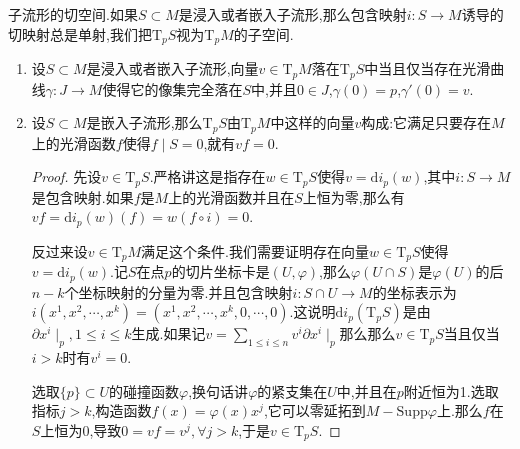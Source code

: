 子流形的切空间.如果$S\subset M$是浸入或者嵌入子流形,那么包含映射$i:S\to M$诱导的切映射总是单射,我们把$\mathrm{T}_pS$视为$\mathrm{T}_pM$的子空间.
\begin{enumerate}
	\item 设$S\subset M$是浸入或者嵌入子流形,向量$v\in\mathrm{T}_pM$落在$\mathrm{T}_pS$中当且仅当存在光滑曲线$\gamma:J\to M$使得它的像集完全落在$S$中,并且$0\in J$,$\gamma(0)=p$,$\gamma'(0)=v$.
	\item 设$S\subset M$是嵌入子流形,那么$\mathrm{T}_pS$由$\mathrm{T}_pM$中这样的向量$v$构成:它满足只要存在$M$上的光滑函数$f$使得$f\mid S=0$,就有$vf=0$.
	\begin{proof}
		
		先设$v\in\mathrm{T}_pS$.严格讲这是指存在$w\in\mathrm{T}_pS$使得$v=\mathrm{d}i_p(w)$,其中$i:S\to M$是包含映射.如果$f$是$M$上的光滑函数并且在$S$上恒为零,那么有$vf=\mathrm{d}i_p(w)(f)=w(f\circ i)=0$.
		
		\qquad
		
		反过来设$v\in\mathrm{T}_pM$满足这个条件.我们需要证明存在向量$w\in\mathrm{T}_pS$使得$v=\mathrm{d}i_p(w)$.记$S$在点$p$的切片坐标卡是$(U,\varphi)$,那么$\varphi(U\cap S)$是$\varphi(U)$的后$n-k$个坐标映射的分量为零.并且包含映射$i:S\cap U\to M$的坐标表示为$i(x^1,x^2,\cdots,x^k)=(x^1,x^2,\cdots,x^k,0,\cdots,0)$.这说明$\mathrm{d}i_p(\mathrm{T}_pS)$是由$\partial x^i\mid_p,1\le i\le k$生成.如果记$v=\sum_{1\le i\le n}v^i\partial x^i\mid_p$那么那么$v\in\mathrm{T}_pS$当且仅当$i>k$时有$v^i=0$.
		
		\qquad
		
		选取$\{p\}\subset U$的碰撞函数$\varphi$,换句话讲$\varphi$的紧支集在$U$中,并且在$p$附近恒为1.选取指标$j>k$,构造函数$f(x)=\varphi(x)x^j$,它可以零延拓到$M-\mathrm{Supp}\varphi$上.那么$f$在$S$上恒为0,导致$0=vf=v^j,\forall j>k$,于是$v\in\mathrm{T}_pS$.
	\end{proof}
\end{enumerate}


